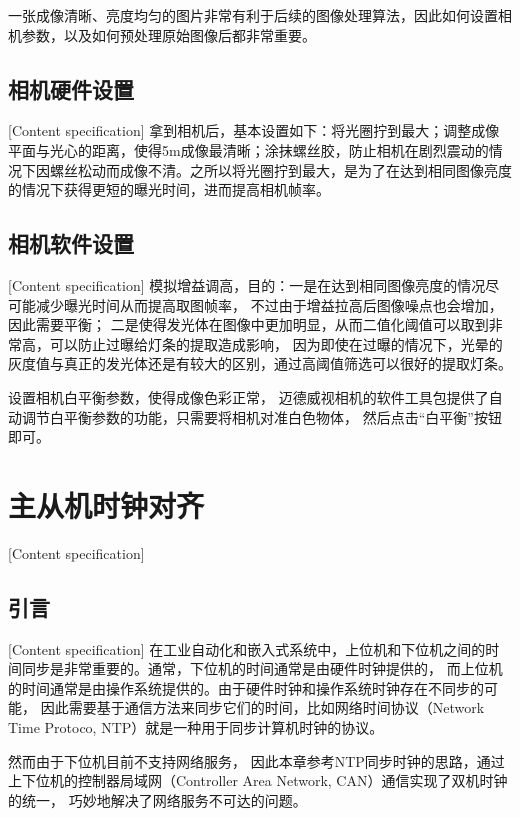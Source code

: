 一张成像清晰、亮度均匀的图片非常有利于后续的图像处理算法，因此如何设置相机参数，以及如何预处理原始图像后都非常重要。
\subsection{相机硬件设置}[Content specification]
拿到相机后，基本设置如下：将光圈拧到最大；调整成像平面与光心的距离，使得5m成像最清晰；涂抹螺丝胶，防止相机在剧烈震动的情况下因螺丝松动而成像不清。之所以将光圈拧到最大，是为了在达到相同图像亮度的情况下获得更短的曝光时间，进而提高相机帧率。
\subsection{相机软件设置}[Content specification]
模拟增益调高，目的：一是在达到相同图像亮度的情况尽可能减少曝光时间从而提高取图帧率，
不过由于增益拉高后图像噪点也会增加，因此需要平衡； 
二是使得发光体在图像中更加明显，从而二值化阈值可以取到非常高，可以防止过曝给灯条的提取造成影响，
因为即使在过曝的情况下，光晕的灰度值与真正的发光体还是有较大的区别，通过高阈值筛选可以很好的提取灯条。

设置相机白平衡参数，使得成像色彩正常，
迈德威视相机的软件工具包提供了自动调节白平衡参数的功能，只需要将相机对准白色物体，
然后点击“白平衡”按钮即可。




\section{主从机时钟对齐}[Content specification]


\subsection{引言}[Content specification]
在工业自动化和嵌入式系统中，上位机和下位机之间的时间同步是非常重要的。通常，下位机的时间通常是由硬件时钟提供的，
而上位机的时间通常是由操作系统提供的。由于硬件时钟和操作系统时钟存在不同步的可能，
因此需要基于通信方法来同步它们的时间，比如网络时间协议（Network Time Protoco, NTP）\cite{sommars2022client}就是一种用于同步计算机时钟的协议。
\par

然而由于下位机目前不支持网络服务，
因此本章参考NTP同步时钟的思路，通过上下位机的控制器局域网（Controller Area Network, CAN）通信实现了双机时钟的统一，
巧妙地解决了网络服务不可达的问题。


